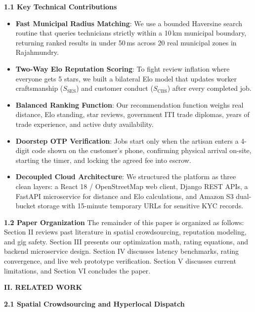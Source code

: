 \documentclass[10pt,twocolumn,a4paper]{article}
\begin{document}
\vspace{0.35em}
\noindent
\textbf{1.1 Key Technical Contributions}
\begin{itemize}
    \item \textbf{Fast Municipal Radius Matching}: We use a bounded Haversine search routine that queries technicians strictly within a 10\,km municipal boundary, returning ranked results in under 50\,ms across 20 real municipal zones in Rajahmundry.
    \item \textbf{Two-Way Elo Reputation Scoring}: To fight review inflation where everyone gets 5 stars, we built a bilateral Elo model that updates worker craftsmanship ($S_{\text{SES}}$) and customer conduct ($S_{\text{CBS}}$) after every completed job.
    \item \textbf{Balanced Ranking Function}: Our recommendation function weighs real distance, Elo standing, star reviews, government ITI trade diplomas, years of trade experience, and active duty availability.
    \item \textbf{Doorstep OTP Verification}: Jobs start only when the artisan enters a 4-digit code shown on the customer's phone, confirming physical arrival on-site, starting the timer, and locking the agreed fee into escrow.
    \item \textbf{Decoupled Cloud Architecture}: We structured the platform as three clean layers: a React 18 / OpenStreetMap web client, Django REST APIs, a FastAPI microservice for distance and Elo calculations, and Amazon S3 dual-bucket storage with 15-minute temporary URLs for sensitive KYC records.
\end{itemize}

\vspace{0.35em}
\noindent
\textbf{1.2 Paper Organization}
The remainder of this paper is organized as follows: Section II reviews past literature in spatial crowdsourcing, reputation modeling, and gig safety. Section III presents our optimization math, rating equations, and backend microservice design. Section IV discusses latency benchmarks, rating convergence, and live web prototype verification. Section V discusses current limitations, and Section VI concludes the paper.

\vspace{0.45em}
\noindent
\textbf{\large II. RELATED WORK}

\vspace{0.3em}
\noindent
\textbf{2.1 Spatial Crowdsourcing and Hyperlocal Dispatch}
\end{document}
